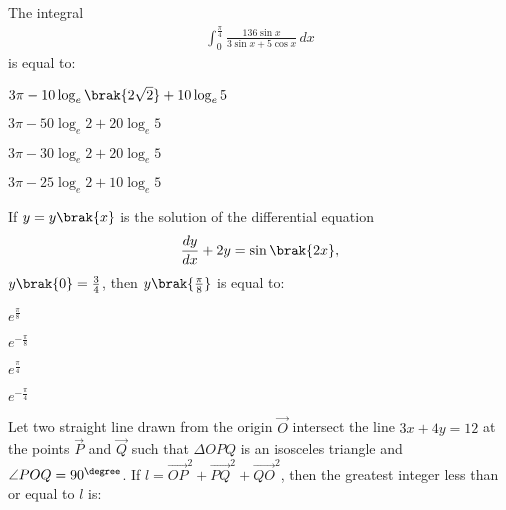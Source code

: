 \iffalse
\title{Assignment-3}
\author{EE24BTECH11049}
\section{mcq-single}
\fi

%
    \item 
    The integral 
    \begin{align*}
        \int_0^{\frac{\pi}{4}}\frac{136\sin{x}}{3\sin{x} + 5\cos{x}}\, dx 
    \end{align*}
    is equal to:

    \hfill{}

    \begin{enumerate}
    \begin{multicols}{2}
        \item $3\pi - 10\log_e\brak{2\sqrt{2}} + 10\log_e5$
        \item $3\pi - 50\log_e2 + 20\log_e5$
        \item $3\pi - 30\log_e2 + 20\log_e5$
        \item $3\pi - 25\log_e2 + 10\log_e5$
    \end{multicols}   
    \end{enumerate}

    \item 
    If $y = y\brak{x}$ is the solution of the differential equation 
    \begin{align*}
        \frac{dy}{dx} + 2y = \sin{\brak{2x}},
    \end{align*}
    $y\brak{0} = \frac{3}{4}$, then $y\brak{\frac{\pi}{8}}$ is equal to:

    \hfill{}

    \begin{enumerate}
    \begin{multicols}{4}
        \item $e^{\frac{\pi}{8}}$
        \item $e^{-\frac{\pi}{8}}$
        \item $e^{\frac{\pi}{4}}$
        \item $e^{-\frac{\pi}{4}}$
    \end{multicols}   
    \end{enumerate}

    \item 
    Let two straight line drawn from the origin $\vec{O}$ intersect the line $3x + 4y = 12$ at the points $\vec{P}$ and $\vec{Q}$ such that $\Delta OPQ$ is an isosceles triangle and $\angle POQ = 90^{\degree}$. If $l = \vec{OP}^2 + \vec{PQ}^2 + \vec{QO}^2$, then the greatest integer less than or equal to $l$ is:

